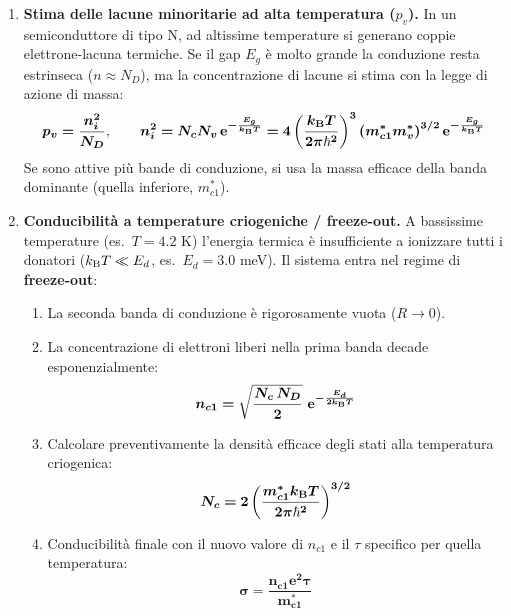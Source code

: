 \begin{enumerate}
\item \textbf{Stima delle lacune minoritarie ad alta temperatura ($p_v$).}
In un semiconduttore di tipo N, ad altissime temperature si generano coppie elettrone-lacuna termiche. Se il gap $E_g$ è molto grande la conduzione resta estrinseca ($n\approx N_D$), ma la concentrazione di lacune si stima con la legge di azione di massa:
\[ \bm{p_v = \frac{n_i^2}{N_D}}, \qquad
   \bm{n_i^2 = N_cN_v\,\mathrm{e}^{-\frac{E_g}{k_{\mathrm{B}} T}} = 4\left(\frac{k_{\mathrm{B}} T}{2\pi\hbar^2}\right)^{3}\left(m_{c1}^*m_v^*\right)^{3/2}\mathrm{e}^{-\frac{E_g}{k_{\mathrm{B}} T}}} \]
Se sono attive più bande di conduzione, si usa la massa efficace della banda dominante (quella inferiore, $m_{c1}^*$).

\item \textbf{Conducibilità a temperature criogeniche / freeze-out.}
A bassissime temperature (es.\ $T=4.2$ K) l'energia termica è insufficiente a ionizzare tutti i donatori ($k_{\mathrm{B}} T\ll E_d$, es.\ $E_d=3.0$ meV). Il sistema entra nel regime di \textbf{freeze-out}:
\begin{enumerate}
    \item La seconda banda di conduzione è rigorosamente vuota ($R\to0$).
    \item La concentrazione di elettroni liberi nella prima banda decade esponenzialmente:
    \[ \bm{n_{c1}=\sqrt{\frac{N_c\,N_D}{2}}\ \ee^{-\frac{E_d}{2\kB T}}} \]
    \item Calcolare preventivamente la densità efficace degli stati alla temperatura criogenica:
    \[ \bm{N_c = 2\left(\frac{m_{c1}^*k_{\mathrm{B}} T}{2\pi\hbar^2}\right)^{3/2}} \]
    \item Conducibilità finale con il nuovo valore di $n_{c1}$ e il $\tau$ specifico per quella temperatura:
    \[ \bm{\sigma = \frac{n_{c1}e^2\tau}{m_{c1}^*}} \]
\end{enumerate}
\end{enumerate}


\vspace{0.5cm}
